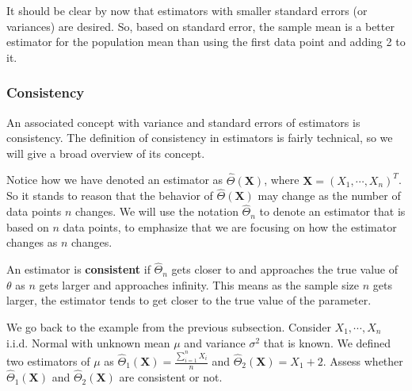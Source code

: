 \documentclass[
]{book}
\begin{document}
It should be clear by now that estimators with smaller standard errors (or variances) are desired. So, based on standard error, the sample mean is a better estimator for the population mean than using the first data point and adding 2 to it.

\hypertarget{consistency}{%
\subsubsection{Consistency}\label{consistency}}

An associated concept with variance and standard errors of estimators is consistency. The definition of consistency in estimators is fairly technical, so we will give a broad overview of its concept.

Notice how we have denoted an estimator as \(\hat{\Theta}(\boldsymbol{X})\), where \(\boldsymbol{X} = (X_1, \cdots, X_n)^T\). So it stands to reason that the behavior of \(\hat{\Theta}(\boldsymbol{X})\) may change as the number of data points \(n\) changes. We will use the notation \(\hat{\Theta}_n\) to denote an estimator that is based on \(n\) data points, to emphasize that we are focusing on how the estimator changes as \(n\) changes.

An estimator is \textbf{consistent} if \(\hat{\Theta}_n\) gets closer to and approaches the true value of \(\theta\) as \(n\) gets larger and approaches infinity. This means as the sample size \(n\) gets larger, the estimator tends to get closer to the true value of the parameter.

We go back to the example from the previous subsection. Consider \(X_1, \cdots, X_n\) i.i.d. Normal with unknown mean \(\mu\) and variance \(\sigma^2\) that is known. We defined two estimators of \(\mu\) as \(\hat{\Theta}_1(\boldsymbol{X}) = \frac{\sum_{i=1}^n X_i}{n}\) and \(\hat{\Theta}_2(\boldsymbol{X}) = X_1 + 2\). Assess whether \(\hat{\Theta}_1(\boldsymbol{X})\) and \(\hat{\Theta}_2(\boldsymbol{X})\) are consistent or not.
\end{document}
